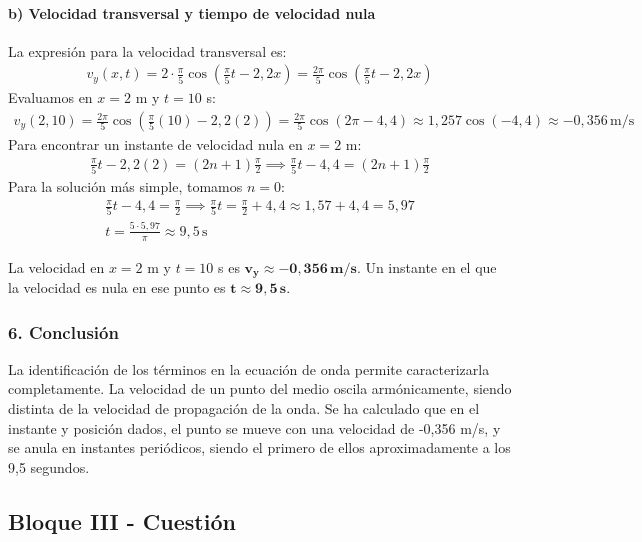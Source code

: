 \paragraph{b) Velocidad transversal y tiempo de velocidad nula}
La expresión para la velocidad transversal es:
\begin{gather}
    v_y(x,t) = 2 \cdot \frac{\pi}{5} \cos\left(\frac{\pi}{5}t - 2,2x\right) = \frac{2\pi}{5} \cos\left(\frac{\pi}{5}t - 2,2x\right)
\end{gather}
Evaluamos en $x=2$ m y $t=10$ s:
\begin{gather}
    v_y(2, 10) = \frac{2\pi}{5} \cos\left(\frac{\pi}{5}(10) - 2,2(2)\right) = \frac{2\pi}{5} \cos(2\pi - 4,4) \approx 1,257 \cos(-4,4) \approx -0,356 \, \text{m/s}
\end{gather}
Para encontrar un instante de velocidad nula en $x=2$ m:
\begin{gather}
    \frac{\pi}{5}t - 2,2(2) = (2n+1)\frac{\pi}{2} \implies \frac{\pi}{5}t - 4,4 = (2n+1)\frac{\pi}{2}
\end{gather}
Para la solución más simple, tomamos $n=0$:
\begin{gather}
    \frac{\pi}{5}t - 4,4 = \frac{\pi}{2} \implies \frac{\pi}{5}t = \frac{\pi}{2} + 4,4 \approx 1,57 + 4,4 = 5,97 \nonumber \\
    t = \frac{5 \cdot 5,97}{\pi} \approx 9,5 \, \text{s}
\end{gather}
\begin{cajaresultado}
La velocidad en $x=2$ m y $t=10$ s es $\boldsymbol{v_y \approx -0,356 \, \textbf{m/s}}$. Un instante en el que la velocidad es nula en ese punto es $\boldsymbol{t \approx 9,5 \, \textbf{s}}$.
\end{cajaresultado}

\subsubsection*{6. Conclusión}
\begin{cajaconclusion}
La identificación de los términos en la ecuación de onda permite caracterizarla completamente. La velocidad de un punto del medio oscila armónicamente, siendo distinta de la velocidad de propagación de la onda. Se ha calculado que en el instante y posición dados, el punto se mueve con una velocidad de -0,356 m/s, y se anula en instantes periódicos, siendo el primero de ellos aproximadamente a los 9,5 segundos.
\end{cajaconclusion}

\newpage
\subsection{Bloque III - Cuestión}
\label{subsec:B3_2014_jun_ord}

